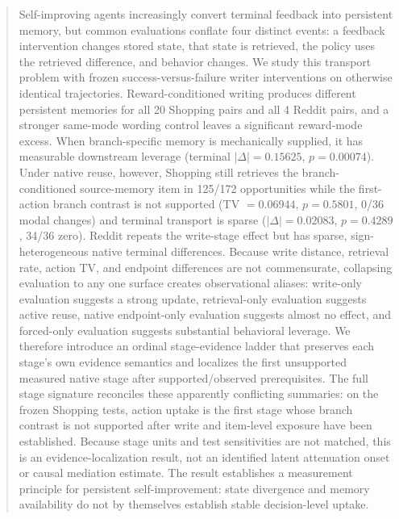 \begin{abstract}
Self-improving agents increasingly convert terminal feedback into persistent memory, but common evaluations conflate four distinct events: a feedback intervention changes stored state, that state is retrieved, the policy uses the retrieved difference, and behavior changes. We study this transport problem with frozen success-versus-failure writer interventions on otherwise identical trajectories. Reward-conditioned writing produces different persistent memories for all 20 Shopping pairs and all 4 Reddit pairs, and a stronger same-mode wording control leaves a significant reward-mode excess. When branch-specific memory is mechanically supplied, it has measurable downstream leverage (terminal $|\Delta|=0.15625$, $p=0.00074$). Under native reuse, however, Shopping still retrieves the branch-conditioned source-memory item in 125/172 opportunities while the first-action branch contrast is not supported (TV $=0.06944$, $p=0.5801$, 0/36 modal changes) and terminal transport is sparse ($|\Delta|=0.02083$, $p=0.4289$, 34/36 zero). Reddit repeats the write-stage effect but has sparse, sign-heterogeneous native terminal differences. Because write distance, retrieval rate, action TV, and endpoint differences are not commensurate, collapsing evaluation to any one surface creates observational aliases: write-only evaluation suggests a strong update, retrieval-only evaluation suggests active reuse, native endpoint-only evaluation suggests almost no effect, and forced-only evaluation suggests substantial behavioral leverage. We therefore introduce an ordinal stage-evidence ladder that preserves each stage's own evidence semantics and localizes the first unsupported measured native stage after supported/observed prerequisites. The full stage signature reconciles these apparently conflicting summaries: on the frozen Shopping tests, action uptake is the first stage whose branch contrast is not supported after write and item-level exposure have been established. Because stage units and test sensitivities are not matched, this is an evidence-localization result, not an identified latent attenuation onset or causal mediation estimate. The result establishes a measurement principle for persistent self-improvement: state divergence and memory availability do not by themselves establish stable decision-level uptake.
\end{abstract}
